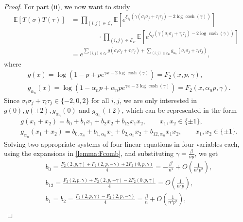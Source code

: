 \documentclass[11pt,oneside]{amsart}
\numberwithin{equation}{section}  %
\theoremstyle{plain}
\theoremstyle{remark}
\def \E {{\mathbb E}}
\def \cE {\mathcal{E}}
\begin{document}
\begin{proof}
For part (ii), we now want to study
\begin{equation*}
\begin{split}
\E\left[T(\sigma) T(\tau) \right] & = \prod_{(i,j) \in \cE_I} \E \left[ e^{\xi_{ij} \left( \gamma (\sigma_i \sigma_j + \tau_i \tau_j) - 2 \log \cosh(\gamma) \right) } \right] \\
&\qquad\qquad \cdot \prod_{(i,j) \in \cE_E} \E \left[ e^{ \zeta_{ij} \left( \gamma (\sigma_i \sigma_j + \tau_i \tau_j) - 2 \log \cosh(\gamma) \right)  } \right] \\
& = e^{\sum_{(i,j) \in \cE_I} g(\sigma_i \sigma_j + \tau_i \tau_j) + \sum_{(i,j) \in \cE_E} g_{\alpha_n}(\sigma_i \sigma_j + \tau_i \tau_j)},
\end{split}
\end{equation*}
where 
\begin{align*}
& g(x) = \log \left( 1-p+pe^{\gamma x - 2 \log \cosh(\gamma)}\right) = F_2(x,p,\gamma), \\
& g_{\alpha_n}(x) = \log \left( 1-\alpha_n p+\alpha_n pe^{\gamma x - 2 \log \cosh(\gamma)}\right) = F_2(x, \alpha_n p,\gamma).
\end{align*}
Since $\sigma_i \sigma_j + \tau_i \tau_j \in \{ -2, 0, 2 \}$ for all $i,j$, we are only interested in $g(0), g(\pm2), g_{\alpha_n}(0)$ and $g_{\alpha_n}(\pm2)$, which can be represented in the form
\begin{align*}
& g(x_1 + x_2) = b_0 + b_1 x_1 + b_2 x_2 + b_{12} x_1x_2, \qquad x_1, x_2 \in \{ \pm 1 \}, \\
& g_{\alpha_n}(x_1 + x_2) = b_{0, \alpha_n} + b_{1, \alpha_n} x_1 + b_{2, \alpha_n} x_2 + b_{12, \alpha_n} x_1x_2, \qquad x_1, x_2 \in \{ \pm 1 \}.
\end{align*}
Solving two appropriate systems of four linear equations in four variables each, using the expansions in \ref{lemma:Fcomb}, and substituting $\gamma = \frac{\beta}{np}$, we get
\begin{equation}\label{eq:cost-b}
\begin{split}
& b_0 =  \frac{F_2(2,p, \gamma) + F_2(2,p,-\gamma) + 2F_2(0,p,\gamma)}{4} =- \frac{\beta^2}{n^2} + O \left( \frac{1}{n^4p^2}\right), \\
& b_{12} = \frac{F_2(2,p, \gamma) + F_2(2,p,-\gamma) - 2F_2(0,p,\gamma)}{4} = O \left( \frac{1}{n^2p}\right), \\
& b_1 = b_2 = \frac{F_2(2,p, \gamma) - F_2(2,p,-\gamma)}{4} =\frac{\beta}{n} + O \left( \frac{1}{n^3 p^2}\right), \\
\end{split}

\end{equation}
\end{proof}
\end{document}
